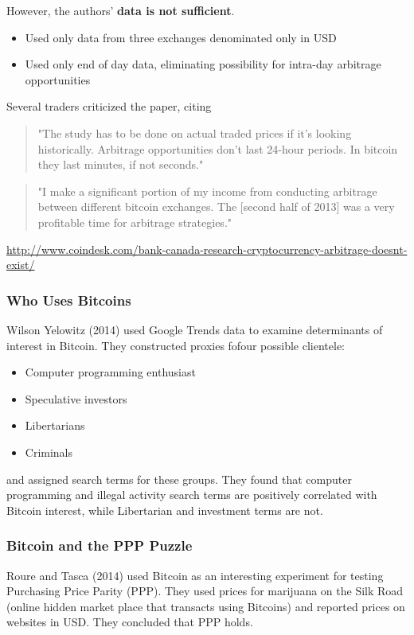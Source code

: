 \documentclass[9pt, compress]{beamer}
\begin{document}
\begin{frame}[fragile]
However, the authors' \textbf{data is not sufficient}.

\begin{itemize}
\item Used only data from three exchanges denominated only in USD
\item Used only end of day data, eliminating possibility for intra-day arbitrage opportunities
\end{itemize}

Several traders criticized the paper, citing

\begin{quote}
"The study has to be done on actual traded prices if it's looking historically. Arbitrage opportunities don't last 24-hour periods. In bitcoin they last minutes, if not seconds."
\end{quote}

\begin{quote}
"I make a significant portion of my income from conducting arbitrage between different bitcoin exchanges. The [second half of 2013] was a very profitable time for arbitrage strategies."
\end{quote}
\url{http://www.coindesk.com/bank-canada-research-cryptocurrency-arbitrage-doesnt-exist/}
\end{frame}


\begin{frame}[fragile]
\frametitle{Who Uses Bitcoins}
Wilson Yelowitz (2014) used Google Trends data to examine determinants of interest in Bitcoin. They constructed proxies fofour possible clientele: 

\begin{itemize}
\item Computer programming enthusiast
\item Speculative investors
\item Libertarians
\item Criminals
\end{itemize}

and assigned search terms for these groups. They found that computer programming and illegal activity search terms are positively correlated with Bitcoin interest, while Libertarian and investment terms are not.
\end{frame}

\begin{frame}[fragile]
\frametitle{Bitcoin and the PPP Puzzle}
Roure and Tasca (2014) used Bitcoin as an interesting experiment for testing Purchasing Price Parity (PPP). They used prices for marijuana on the Silk Road (online hidden market place that transacts using Bitcoins) and reported prices on websites in USD. They concluded that PPP holds.
\end{frame}
\end{document}

